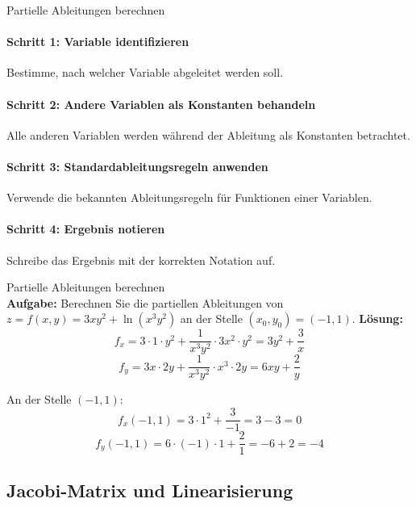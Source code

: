 \begin{KR}{Partielle Ableitungen berechnen}\\
\paragraph{Schritt 1: Variable identifizieren}
Bestimme, nach welcher Variable abgeleitet werden soll.

\paragraph{Schritt 2: Andere Variablen als Konstanten behandeln}
Alle anderen Variablen werden während der Ableitung als Konstanten betrachtet.

\paragraph{Schritt 3: Standardableitungsregeln anwenden}
Verwende die bekannten Ableitungsregeln für Funktionen einer Variablen.

\paragraph{Schritt 4: Ergebnis notieren}
Schreibe das Ergebnis mit der korrekten Notation auf.
\end{KR}

\begin{example2}{Partielle Ableitungen berechnen}\\
\textbf{Aufgabe:} Berechnen Sie die partiellen Ableitungen von $z = f(x,y) = 3xy^2 + \ln(x^3 y^2)$ an der Stelle $(x_0, y_0) = (-1, 1)$.
\tcblower
\textbf{Lösung:}
$$f_x = 3 \cdot 1 \cdot y^2 + \frac{1}{x^3 y^2} \cdot 3x^2 \cdot y^2 = 3y^2 + \frac{3}{x}$$
$$f_y = 3x \cdot 2y + \frac{1}{x^3 y^2} \cdot x^3 \cdot 2y = 6xy + \frac{2}{y}$$

An der Stelle $(-1, 1)$:
$$f_x(-1, 1) = 3 \cdot 1^2 + \frac{3}{-1} = 3 - 3 = 0$$
$$f_y(-1, 1) = 6 \cdot (-1) \cdot 1 + \frac{2}{1} = -6 + 2 = -4$$
\end{example2}

\subsection{Jacobi-Matrix und Linearisierung}

